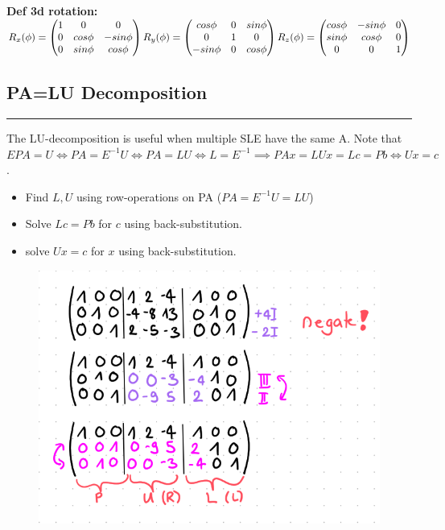 \documentclass[7pt,landscape, margin = 0.1mm]{article}
\newcommand*{\mysubsection}[1]{\vspace{-2mm}\color{chaptercolor}\subsection{ #1 }
\vspace{-1mm}\hrule\vspace{1.5mm}\color{black}
\vspace{2mm}}
\newcommand{\DEF}[2]{\color{chaptercolor}\bf{Def #1}:\color{black}    \hspace{0.2cm} #2}
\begin{document}
\begin{multicols}{4}
\begin{flushleft}
{{\DEF{3d rotation}{$R_x(\phi) = \begin{pmatrix}
 1&0  &0  \\
 0& cos \phi  & -sin \phi  \\
 0& sin \phi  &  cos \phi \\
\end{pmatrix}\\
R_y(\phi) = \begin{pmatrix}
 cos \phi &0  &sin \phi  \\
 0&  1&0   \\
 -sin \phi& 0  &  cos \phi \\
\end{pmatrix}\\
R_z(\phi) = \begin{pmatrix}
  cos \phi& -sin \phi  &0  \\
 sin \phi& cos \phi  & 0  \\
 0& 0  &   1\\
\end{pmatrix} $}

\mysubsection{PA=LU Decomposition}
The LU-decomposition is useful when multiple SLE have the same A. Note that $EPA=U \Leftrightarrow PA=E^{-1}U \Leftrightarrow PA=LU \Leftrightarrow L=E^{-1} \implies PAx=LUx=Lc=Pb \Leftrightarrow Ux=c$.

\begin{itemize}
\item Find $L,U$ using row-operations on PA ($PA=E^{-1}U=LU$)
\item Solve $Lc=Pb$ for $c$ using back-substitution.
\item solve $Ux=c$ for $x$ using back-substitution.
\end{itemize}

\begin{figure}[H]
\centering
\includegraphics[scale=0.5]{pictures/LU-decomposition.png} 
\end{figure}

}}
\end{flushleft}
\end{multicols}
\end{document}
